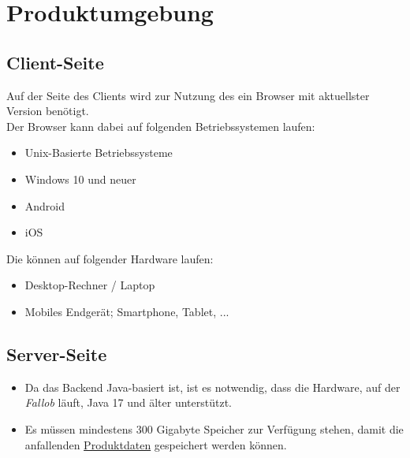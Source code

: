 \section{Produktumgebung}

\subsection{Client-Seite}
Auf der Seite des Clients wird zur Nutzung des  ein Browser mit aktuellster Version benötigt.\\
Der Browser kann dabei auf folgenden Betriebssystemen laufen:

\begin{itemize}
    \item Unix-Basierte Betriebssysteme
    \item Windows 10 und neuer
    \item Android
    \item iOS
\end{itemize}

Die  können auf folgender Hardware laufen:

\begin{itemize}
    \item Desktop-Rechner / Laptop 
    \item Mobiles Endgerät; Smartphone, Tablet, ...
\end{itemize}

    
\subsection{Server-Seite}
\begin{itemize}
    \item Da das Backend Java-basiert ist, ist es notwendig, dass die Hardware, auf der \textit{Fallob} läuft, Java 17 und älter unterstützt.
    \item Es müssen mindestens 300 Gigabyte Speicher zur Verfügung stehen, damit die anfallenden \hyperref[PD]{Produktdaten} gespeichert werden können.
\end{itemize}